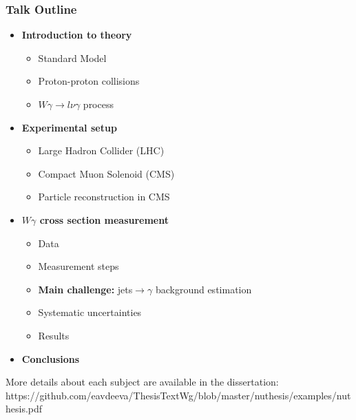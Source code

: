 \begin{frame}\frametitle{Talk Outline}
  \begin{itemize}
     \item {\scriptsize\bfseries{Introduction to theory}}
       \begin{itemize}
          \tiny
          \item Standard Model
          \item Proton-proton collisions
          \item $W\gamma\rightarrow l\nu\gamma$ process
       \end{itemize}
     \item {\scriptsize\bfseries{Experimental setup}}
       \begin{itemize}
          \tiny
          \item Large Hadron Collider (LHC)
          \item Compact Muon Solenoid (CMS)
          \item Particle reconstruction in CMS
       \end{itemize}
     \item {\scriptsize\bfseries{$W\gamma$ cross section measurement}}
       \begin{itemize}
          \tiny
          \item Data
          \item Measurement steps
          \item {\bfseries{Main challenge:}} jets$\rightarrow\gamma$ background estimation
          \item Systematic uncertainties
          \item Results
       \end{itemize}
     \item {\scriptsize\bfseries{Conclusions}}
  \end{itemize}

  \tiny
  More details about each subject are available in the dissertation:\\
  https://github.com/eavdeeva/ThesisTextWg/blob/master/nuthesis/examples/nuthesis.pdf
\end{frame}%

